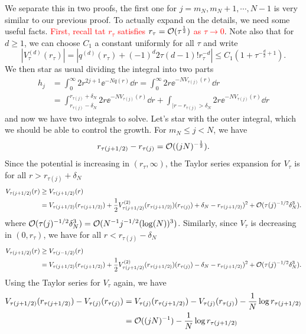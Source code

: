 We separate this in two proofs, the first one for $j = m_N, m_N + 1, \cdots, N-1$  is very similar to our previous proof. To actually expand on the details, we need some useful facts. \textcolor{red}{First, recall tat $r_{\tau}$ satisfies $r_\tau = \mathcal{O}(\tau^{\frac{1}{2}})$ as $\tau \rightarrow 0$}. Note also that for $d \geq 1$, we can choose $C_1$ a constant uniformly for all $\tau$ and write
\begin{equation}
	|V^{(d)}_\tau(r_\tau)| = |q^{(d)}(r_\tau) + (-1)^{d} 2 \tau (d-1)! r_\tau^{-d} | \leq C_1 (1 + \tau^{-\frac{d}{2} + 1}).
\end{equation} 
We then star as usual dividing the integral into two parts
\begin{align}
	h_j & = \int_{0}^{\infty} 2 r^{2j + 1} \ee^{-N q(r)} \dd r = \int_{0}^{\infty} 2 r \ee^{-N V_{\tau(j)} (r)} \dd r \\
	 &= \int_{r_{\tau(j)} - \delta_N}^{r_{\tau(j)} + \delta_N} 2 r \ee^{-N V_{\tau(j)}(r)} \dd r+ \int_{|r - r_{\tau(j)} > \delta_N} 2 r \ee^{-NV_{\tau(j)}(r)} \dd r
\end{align}
and now we have two integrals to solve. Let's star with the outer integral, which we should be able to control the growth. For $m_N \leq j < N$, we have
\begin{equation}
	r_{\tau(j + 1/2)} - r_{\tau(j)} = \mathcal{O}((jN)^{-\frac{1}{2}}).
\end{equation}
Since the potential is increasing in $(r_\tau, \infty)$, the Taylor series expansion for $V_\tau$ is for all $r > r_{\tau(j)} + \delta_N$
\begin{align}
	V_{\tau(j + 1/2)}(r) & \geq V_{\tau(j + 1/2)}(r) \\
	& = V_{\tau(j + 1/2)}(r_{\tau(j + 1/2)}) + \frac{1}{2} V^{(2)}_{\tau(j + 1/2)}(r_{\tau(j + 1/2)}) (r_{\tau(j)}) + \delta_N - r_{\tau(j + 1/2)})^2 + \mathcal{O}(\tau(j)^{-1/2} \delta^3_N).
\end{align}
where $\mathcal{O}(\tau(j)^{-1/2} \delta^3_N) = \mathcal{O}(N^{-1} j^{-1/2}(\log(N))^3)$. Similarly, since $V_{\tau}$ is decreasing in $(0, r_\tau)$, we have for all $r < r_{\tau(j)} - \delta_N$
\begin{align}
	V_{\tau(j + 1/2)}(r) & \geq V_{\tau(j - 1/2)}(r) \\
	& = V_{\tau(j + 1/2)}(r_{\tau(j + 1/2)}) + \frac{1}{2} V^{(2)}_{\tau(j + 1/2)}(r_{\tau(j + 1/2)}) (r_{\tau(j)}) - \delta_N - r_{\tau(j + 1/2)})^2 + \mathcal{O}(\tau(j)^{-1/2} \delta^3_N).
\end{align}
Using the Taylor series for $V_\tau$ again, we have
\begin{align}
	V_{\tau(j+1/2)}(r_{\tau(j+1/2)}) - V_{\tau(j)}(r_{\tau(j)}) & = V_{\tau(j)}(r_{\tau(j+1/2)}) - V_{\tau(j)}(r_{\tau(j)}) - \frac{1}{N} \log r_{\tau(j+1/2)} \\
	& = \mathcal{O}((jN)^{-1})  - \frac{1}{N} \log r_{\tau(j+1/2)}
\end{align}
